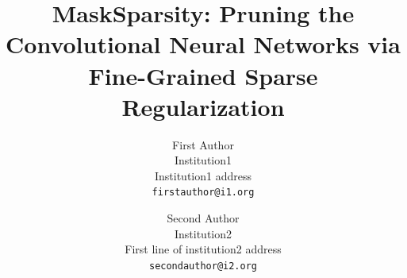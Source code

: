 \documentclass[review]{cvpr}
\begin{document}
\title{MaskSparsity: Pruning the Convolutional Neural Networks via Fine-Grained Sparse Regularization}

\author{First Author\\
Institution1\\
Institution1 address\\
{\tt\small firstauthor@i1.org}
\and
Second Author\\
Institution2\\
First line of institution2 address\\
{\tt\small secondauthor@i2.org}
}

\maketitle
\end{document}
